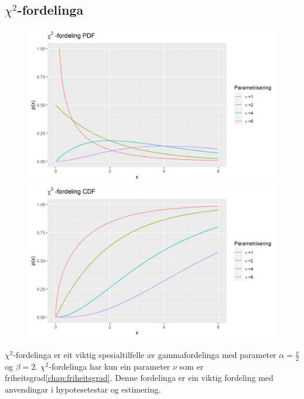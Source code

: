 \subsection{\texorpdfstring{$\chi^2$}{chi}-fordelinga}
\begin{figure}[H]
  \centering
  \begin{minipage}[b]{0.49\textwidth}
\includegraphics[width=\textwidth]{bilete/chisqpdf.png}
  \end{minipage}
  \hfill
  \begin{minipage}[b]{0.49\textwidth}
    \includegraphics[width=\textwidth]{bilete/chisqcdf.png}
  \end{minipage}
\end{figure}

$\chi^2$-fordelinga er eit viktig spesialtilfelle av gammafordelinga med parameter $\alpha = \frac{\nu}{2}$ og $\beta=2$. $\chi^2$-fordelinga har kun ein parameter $\nu$ som er friheitsgrad\ref{chap:friheitsgrad}. Denne fordelinga er ein viktig fordeling med anvendingar i hypotesetestar og estimering. 

